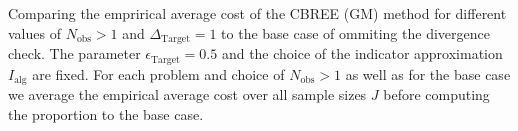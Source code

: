 Comparing the emprirical average cost of the CBREE (GM) method for different values of $N_{ \text{obs} } > 1$  and $\Delta_{\text{Target}}=1$ to the base case of ommiting the divergence check. The parameter $\epsilon_{\text{Target}} = 0.5$ and the choice of the indicator approximation $I_\text{alg}$ are fixed. For each problem and choice of $N_{ \text{obs} } > 1$ as well as for the base case we average the empirical average cost over all sample sizes $J$ before computing the proportion to the base case.